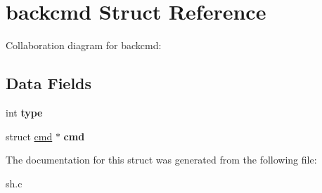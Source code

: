 \hypertarget{structbackcmd}{}\section{backcmd Struct Reference}
\label{structbackcmd}


Collaboration diagram for backcmd\+:
\subsection*{Data Fields}
\begin{DoxyCompactItemize}
\item 
int {\bfseries type}\hypertarget{structbackcmd_a38298e998fc63358cc59f1e0dcf85a38}{}\label{structbackcmd_a38298e998fc63358cc59f1e0dcf85a38}

\item 
struct \hyperlink{structcmd}{cmd} $\ast$ {\bfseries cmd}\hypertarget{structbackcmd_a74a697014e2d3a17710e530fca0e8432}{}\label{structbackcmd_a74a697014e2d3a17710e530fca0e8432}

\end{DoxyCompactItemize}


The documentation for this struct was generated from the following file\+:\begin{DoxyCompactItemize}
\item 
sh.\+c\end{DoxyCompactItemize}
